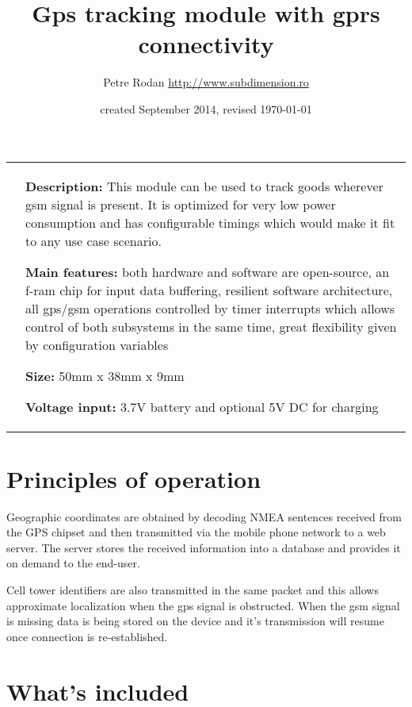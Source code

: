 \documentclass[a4paper,twoside]{refart}
\newenvironment{fulltable}[1][htbp]
 {\begin{table}[#1]%
  \hspace*{-\leftmarginwidth}%
  \begin{minipage}{\fullwidth}}
 {\end{minipage}\end{table}}
\begin{document}
\title{Gps tracking module with gprs connectivity}
\author{Petre Rodan \url{http://www.subdimension.ro}}
\date{created September 2014, revised \today}
\maketitle

\begin{fulltable}
\begin{tabular}{ c p{8cm} }

    \raisebox{-\totalheight}{\texttt{[image: img/izometric]}} &
    \textbf{Description:} This module can be used to track goods wherever gsm signal is present. It is optimized for very low power consumption and has configurable timings which would make it fit to any use case scenario.

    \textbf{Main features:} both hardware and software are open-source, an f-ram chip for input data buffering, resilient software architecture, all gps/gsm operations controlled by timer interrupts which allows control of both subsystems in the same time, great flexibility given by configuration variables

    \textbf{Size:} 50mm x 38mm x 9mm
     
    \textbf{Voltage input:} 3.7V battery and optional 5V DC for charging

\end{tabular}
\end{fulltable}

\tableofcontents
\newpage

\section{Principles of operation}
Geographic coordinates are obtained by decoding NMEA sentences received from the GPS chipset and then transmitted via the mobile phone network to a web server. The server stores the received information into a database and provides it on demand to the end-user.

Cell tower identifiers are also transmitted in the same packet and this allows approximate localization when the gps signal is obstructed. When the gsm signal is missing data is being stored on the device and it's transmission will resume once connection is re-established.

\section{What's included}
\end{document}
